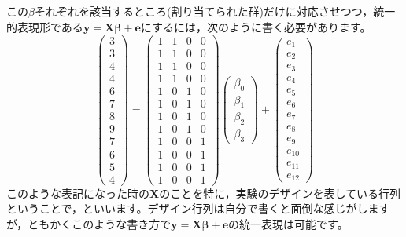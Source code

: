 \documentclass{ltjsbook}
\begin{document}
この$\beta$それぞれを該当するところ(割り当てられた群)だけに対応させつつ，統一的表現形である$\bm{y}=\bm{X\beta}+\bm{e}$にするには，次のように書く必要があります。
\[
\begin{pmatrix}
	3\\
	3\\
	4\\
	4\\
	6\\
	7\\
	8\\
	9\\
	7\\
	6\\
	5\\
	4
	\end{pmatrix}
	= 
	\begin{pmatrix}
	1 & 1 & 0 & 0\\
	1 & 1 & 0 & 0\\
	1 & 1 & 0 & 0\\
	1 & 1 & 0 & 0\\
	1 & 0 & 1 & 0\\
	1 & 0 & 1 & 0\\
	1 & 0 & 1 & 0\\
	1 & 0 & 1 & 0\\
	1 & 0 & 0 & 1\\
	1 & 0 & 0 & 1\\
	1 & 0 & 0 & 1\\
	1 & 0 & 0 & 1
	\end{pmatrix}
	\begin{pmatrix}
	\beta_0\\
	\beta_1\\
	\beta_2\\
	\beta_3
	\end{pmatrix}+
	\begin{pmatrix}
	e_1\\
	e_2\\
	e_3\\
	e_4\\
	e_5\\
	e_6\\
	e_7\\
	e_8\\
	e_9\\
	e_{10}\\
	e_{11}\\
	e_{12}
	
	\end{pmatrix}
\]
このような表記になった時の$\bm{X}$のことを特に，実験のデザインを表している行列ということで，といいます。デザイン行列は自分で書くと面倒な感じがしますが，ともかくこのような書き方で$\bm{y}=\bm{X\beta}+\bm{e}$の統一表現は可能です。
\end{document}
